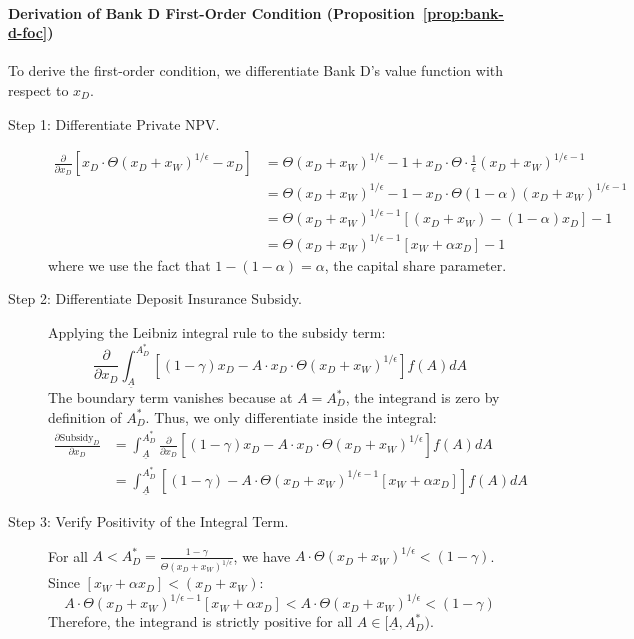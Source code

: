 \documentclass[12pt]{article}
\begin{document}
\paragraph{Derivation of Bank D First-Order Condition (Proposition~\ref{prop:bank-d-foc})}
\label{app:deriv-D-FOC}
To derive the first-order condition, we differentiate Bank D's value function with respect to $x_D$.
\begin{description}
    \item[Step 1: Differentiate Private NPV.]
    \begin{align*}
    \frac{\partial}{\partial x_{D}}[x_{D} \cdot \Theta(x_{D}+x_{W})^{1/\epsilon} - x_{D}] &= \Theta(x_{D}+x_{W})^{1/\epsilon} - 1 + x_{D} \cdot \Theta \cdot \frac{1}{\epsilon}(x_{D}+x_{W})^{1/\epsilon-1} \\
    &= \Theta(x_{D}+x_{W})^{1/\epsilon} - 1 - x_{D} \cdot \Theta(1-\alpha)(x_{D}+x_{W})^{1/\epsilon-1} \\
    &= \Theta(x_{D}+x_{W})^{1/\epsilon-1}[(x_{D}+x_{W}) - (1-\alpha)x_{D}] - 1 \\
    &= \Theta(x_{D}+x_{W})^{1/\epsilon-1}[x_{W}+\alpha x_{D}] - 1
    \end{align*}
    where we use the fact that $1-(1-\alpha)=\alpha$, the capital share parameter.
    
    \item[Step 2: Differentiate Deposit Insurance Subsidy.]
    Applying the Leibniz integral rule to the subsidy term:
    \begin{equation*}
    \frac{\partial}{\partial x_{D}}\int_{\underline{A}}^{A_{D}^{*}}[(1-\gamma)x_{D} - A \cdot x_{D} \cdot \Theta(x_{D}+x_{W})^{1/\epsilon}]f(A)dA
    \end{equation*}
    The boundary term vanishes because at $A=A_{D}^{*}$, the integrand is zero by definition of $A_{D}^{*}$. Thus, we only differentiate inside the integral:
    \begin{align*}
    \frac{\partial \text{Subsidy}_{D}}{\partial x_{D}} &= \int_{\underline{A}}^{A_{D}^{*}}\frac{\partial}{\partial x_{D}}[(1-\gamma)x_{D} - A \cdot x_{D} \cdot \Theta(x_{D}+x_{W})^{1/\epsilon}]f(A)dA \\
    &= \int_{\underline{A}}^{A_{D}^{*}}[(1-\gamma) - A \cdot \Theta(x_{D}+x_{W})^{1/\epsilon-1}[x_{W}+\alpha x_{D}]]f(A)dA
    \end{align*}
    
    \item[Step 3: Verify Positivity of the Integral Term.]
    For all $A < A_{D}^{*} = \frac{1-\gamma}{\Theta(x_{D}+x_{W})^{1/\epsilon}}$, we have $A \cdot \Theta(x_{D}+x_{W})^{1/\epsilon} < (1-\gamma)$. Since $[x_{W}+\alpha x_{D}] < (x_{D}+x_{W})$:
    \begin{equation*}
    A \cdot \Theta(x_{D}+x_{W})^{1/\epsilon-1}[x_{W}+\alpha x_{D}] < A \cdot \Theta(x_{D}+x_{W})^{1/\epsilon} < (1-\gamma)
    \end{equation*}
    Therefore, the integrand is strictly positive for all $A \in [\underline{A}, A_{D}^{*})$.
    

\end{description}
\end{document}
